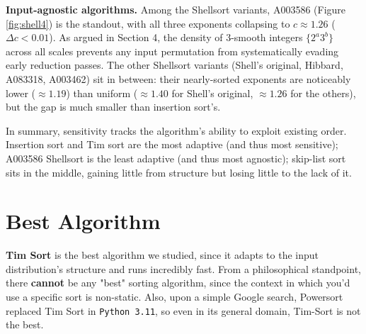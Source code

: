 \documentclass[11pt]{article}
\begin{document}
\textbf{Input-agnostic algorithms.} Among the Shellsort variants, A003586 (Figure \ref{fig:shell4}) is the standout, with all three exponents collapsing to $c \approx 1.26$ ($\Delta c < 0.01$). As argued in Section 4, the density of 3-smooth integers $\{2^a 3^b\}$ across all scales prevents any input permutation from systematically evading early reduction passes. The other Shellsort variants (Shell's original, Hibbard, A083318, A003462) sit in between: their nearly-sorted exponents are noticeably lower ($\approx 1.19$) than uniform ($\approx 1.40$ for Shell's original, $\approx 1.26$ for the others), but the gap is much smaller than insertion sort's.

In summary, sensitivity tracks the algorithm's ability to exploit existing order. Insertion sort and Tim sort are the most adaptive (and thus most sensitive); A003586 Shellsort is the least adaptive (and thus most agnostic); skip-list sort sits in the middle, gaining little from structure but losing little to the lack of it.

\section{Best Algorithm}
\textbf{Tim Sort} is the best algorithm we studied, since it adapts to the input distribution's structure and runs incredibly fast. From a philosophical standpoint, there \textbf{cannot} be any "best" sorting algorithm, since the context in which you'd use a specific sort is non-static. Also, upon a simple Google search, Powersort replaced Tim Sort in \texttt{Python 3.11}, so even in its general domain, Tim-Sort is not the best.
\end{document}
